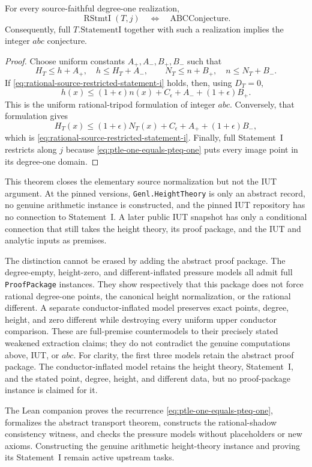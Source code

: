 \begin{theorem}
\label{thm:rational-source-restricted-iff-abc}
For every source-faithful degree-one realization,
\[
 \operatorname{RStmtI}(T,j)
 \quad\Longleftrightarrow\quad \mathrm{ABCConjecture}.
\]
Consequently, full $T.\mathrm{StatementI}$ together with such a realization
implies the integer $abc$ conjecture.
\end{theorem}

\begin{proof}
Choose uniform constants $A_+,A_-,B_+,B_-$ such that
\[
 H_T\le h+A_+,\quad h\le H_T+A_-,\qquad
 N_T\le n+B_+,\quad n\le N_T+B_-.
\]
If \eqref{eq:rational-source-restricted-statement-i} holds, then, using
$D_T=0$,
\[
 h(x)\le(1+\epsilon)n(x)+
 C_\epsilon+A_-+(1+\epsilon)B_+.
\]
This is the uniform rational-tripod formulation of integer $abc$.  Conversely,
that formulation gives
\[
 H_T(x)\le(1+\epsilon)N_T(x)+
 C_\epsilon+A_++(1+\epsilon)B_-,
\]
which is \eqref{eq:rational-source-restricted-statement-i}.  Finally, full
Statement~I restricts along $j$ because
\eqref{eq:ptle-one-equals-pteq-one} puts every image point in its degree-one
domain.
\end{proof}

This theorem closes the elementary source normalization but not the IUT
argument.  At the pinned versions, \texttt{Genl.HeightTheory} is only an
abstract record, no genuine arithmetic instance is constructed, and the pinned
IUT repository has no connection to Statement~I.  A later public IUT snapshot
has only a conditional connection that still takes the height theory, its proof
package, and the IUT and analytic inputs as premises.

The distinction cannot be erased by adding the abstract proof package.  The
degree-empty, height-zero, and different-inflated pressure models all admit
full \texttt{ProofPackage} instances.  They show respectively
that this package does not force rational degree-one points, the canonical
height normalization, or the rational different.  A separate
conductor-inflated model preserves exact points, degree, height, and zero
different while destroying every uniform upper conductor comparison.  These
are full-premise countermodels to their precisely stated weakened extraction
claims; they do not contradict the genuine computations above, IUT, or $abc$.
For clarity, the first three models retain the abstract proof package.  The
conductor-inflated model retains the height theory, Statement~I, and the stated
point, degree, height, and different data, but no proof-package instance is
claimed for it.

The Lean companion proves the recurrence
\eqref{eq:ptle-one-equals-pteq-one}, formalizes the abstract transport theorem,
constructs the rational-shadow consistency witness, and checks the pressure
models without placeholders or new axioms.  Constructing the genuine
arithmetic height-theory instance and proving its Statement~I remain active
upstream tasks.
